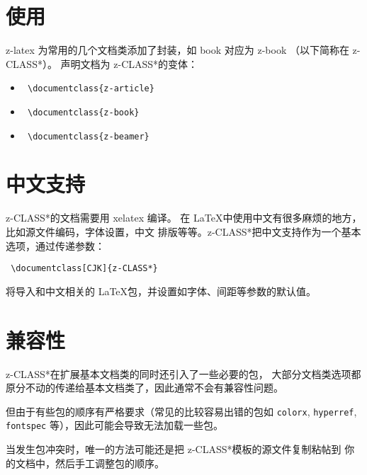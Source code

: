 \newcommand\zclass{z-CLASS*}

\section{使用}

    z-latex 为常用的几个文档类添加了封装，如 book 对应为 z-book （以下简称在 \zclass）。 声明文档为 \zclass 的变体：

    \begin{itemize}
        \item \texttt { \textbackslash documentclass\{z-article\} }
        \item \texttt { \textbackslash documentclass\{z-book\} }
        \item \texttt { \textbackslash documentclass\{z-beamer\} }
    \end{itemize}

\section{中文支持}

    \zclass 的文档需要用 xelatex 编译。
    在 \LaTeX 中使用中文有很多麻烦的地方，比如源文件编码，字体设置，中文
    排版等等。\zclass 把中文支持作为一个基本选项，通过传递参数：

    \texttt { \textbackslash documentclass[CJK]\{\zclass\} }

    将导入和中文相关的 \LaTeX 包，并设置如字体、间距等参数的默认值。

\section{兼容性}

    \zclass 在扩展基本文档类的同时还引入了一些必要的包，
    大部分文档类选项都原分不动的传递给基本文档类了，因此通常不会有兼容性问题。

    但由于有些包的顺序有严格要求（常见的比较容易出错的包如
        \texttt{colorx},
        \texttt{hyperref},
        \texttt{fontspec}
    等），因此可能会导致无法加载一些包。

    当发生包冲突时，唯一的方法可能还是把 \zclass 模板的源文件复制粘帖到
    你的文档中，然后手工调整包的顺序。

